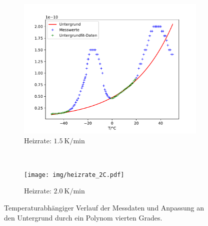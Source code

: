 \begin{figure}[htp]
    \centering
    \begin{subfigure}[t]{0.5\textwidth}
        \centering
        \includegraphics[width=\textwidth]{img/heizrate_15C.pdf}
        \caption{Heizrate: $\SI{1.5}{\kelvin\per\minute}$}
    \end{subfigure}%
    ~
    \begin{subfigure}[t]{0.5\textwidth}
        \centering
        \texttt{[image: img/heizrate\_2C.pdf]}
        \caption{Heizrate: $\SI{2.0}{\kelvin\per\minute}$}
    \end{subfigure}
    \caption{Temperaturabhängiger Verlauf der Messdaten und Anpassung an den Untergrund durch ein Polynom vierten Grades.}
    \label{fig:bg}
\end{figure}

